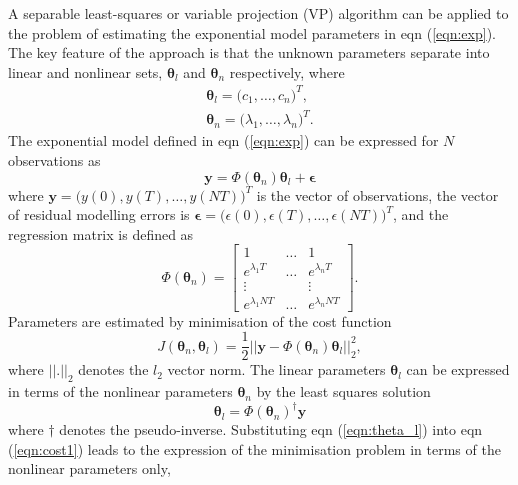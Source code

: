 \documentclass{article}
\newcommand{\vnorm}[1]{\left|\left|#1\right|\right|}
\begin{document}
A separable least-squares or variable projection (VP) algorithm can be applied to the problem of estimating the exponential model parameters in eqn (\ref{eqn:exp}).  The key feature of the approach is that the unknown parameters separate into linear and nonlinear sets, $\boldsymbol{\theta}_l$ and $\boldsymbol{\theta}_n$ respectively, where
\begin{gather}
\boldsymbol{\theta}_l = \bigl( c_1, \ldots, c_n \bigr)^{T}  , \\
\boldsymbol{\theta}_n = \bigl( \lambda_1, \ldots, \lambda_n \bigr)^{T} .
\end{gather}
The exponential model defined in eqn (\ref{eqn:exp}) can be expressed for $N$ observations as 
\begin{equation}
\mathbf{y} = \Phi \left( \boldsymbol{\theta}_n \right) \boldsymbol{\theta}_l + \boldsymbol{\epsilon}
\end{equation}
where $\mathbf{y} = \bigl( y(0), y(T), \ldots, y(NT) \bigr)^{T} $ is the vector of observations, the  vector of residual modelling errors is $\boldsymbol{\epsilon} = \bigl( \epsilon(0), \epsilon(T), \ldots, \epsilon(NT) \bigr)^{T}$, and the regression matrix is defined as
\begin{equation}
\Phi \left( \boldsymbol{\theta}_n \right) = \left[ \begin{array}{ccc}
1 & \ldots & 1 \\
e^{\lambda_1T} & \ldots & e^{\lambda_nT} \\  
\vdots & & \vdots \\
 e^{\lambda_1 NT} & \ldots & e^{\lambda_n NT}
\end{array} \right] .
\end{equation}
Parameters are estimated by minimisation of the cost function
\begin{equation} \label{eqn:cost1}
J\left(\boldsymbol{\theta}_n ,\boldsymbol{\theta}_l  \right) =  \frac{1}{2} \bigl|\bigl| \mathbf{y} - \Phi \left( \boldsymbol{\theta}_n \right) \boldsymbol{\theta}_l \bigr|\bigr| _{2}^{2} ,
\end{equation}
where $\vnorm{.}_2$ denotes the  $l_2$ vector norm.
The linear parameters  $\boldsymbol{\theta}_l$ can be expressed in terms of the nonlinear parameters $\boldsymbol{\theta}_n$ by the least squares solution
\begin{equation} \label{eqn:theta_l}
\boldsymbol{\theta}_l = \Phi \left( \boldsymbol{\theta}_n \right) ^{\dagger} \mathbf{y}
\end{equation}
where $\dagger$ denotes the pseudo-inverse.  Substituting eqn (\ref{eqn:theta_l}) into eqn (\ref{eqn:cost1}) leads to the expression of the minimisation problem in terms of the nonlinear parameters only,
\end{document}

